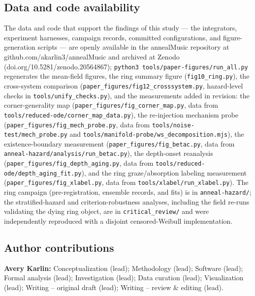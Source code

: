 \documentclass[pdflatex,sn-mathphys,Numbered]{sn-jnl}
\begin{document}
\subsection*{Data and code availability}
The data and code that support the findings of this study --- the integrators,
experiment harnesses, campaign records, committed configurations, and
figure-generation scripts --- are openly available in the annealMusic repository at
github.com/akarlin3/annealMusic and archived at Zenodo
(doi.org/10.5281/zenodo.20564867); \texttt{python3 tools/paper-figures/run\_all.py}
regenerates the mean-field figures, the ring summary figure
(\texttt{fig10\_ring.py}), the cross-system comparison
(\texttt{paper\_figures/fig12\_crosssystem.py}, hazard-level checks in
\texttt{tools/unify\_checks.py}), and the measurements added in revision:
the corner-generality map (\texttt{paper\_figures/fig\_corner\_map.py}, data from
\texttt{tools/reduced-ode/corner\_map\_data.py}), the re-injection mechanism
probe (\texttt{paper\_figures/fig\_mech\_probe.py}, data from
\texttt{tools/noise-test/mech\_probe.py} and
\texttt{tools/manifold-probe/ws\_decomposition.mjs}), the existence-boundary
measurement (\texttt{paper\_figures/fig\_betac.py}, data from
\texttt{anneal-hazard/analysis/run\_betac.py}), the depth-onset reanalysis
(\texttt{paper\_figures/fig\_depth\_aging.py}, data from
\texttt{tools/reduced-ode/depth\_aging\_fit.py}), and the ring
graze/absorption labeling measurement (\texttt{paper\_figures/fig\_xlabel.py},
data from \texttt{tools/xlabel/run\_xlabel.py}). The ring
campaign (pre-registration, ensemble records, and fits) is in
\texttt{anneal-hazard/}; the stratified-hazard and criterion-robustness analyses,
including the field re-runs validating the dying ring object, are in
\texttt{critical\_review/} and were independently reproduced with a disjoint
censored-Weibull implementation.

\subsection*{Author contributions}
\textbf{Avery Karlin:} Conceptualization (lead); Methodology (lead); Software
(lead); Formal analysis (lead); Investigation (lead); Data curation (lead);
Visualization (lead); Writing -- original draft (lead); Writing -- review \&
editing (lead).
\end{document}
